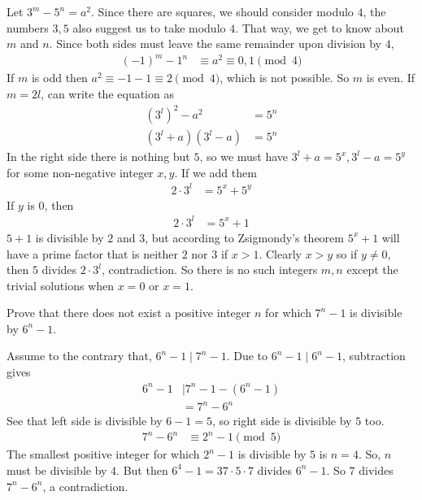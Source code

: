 \begin{solution}
	Let $3^m-5^n=a^2$. Since there are squares, we should consider modulo $4$, the numbers $3,5$ also suggest us to take modulo $4$. That way, we get to know about $m$ and $n$. Since both sides must leave the same remainder upon division by $4$,
	\begin{align*}
		(-1)^m-1^n &\equiv a^2\equiv0,1\pmod4
	\end{align*}
	If $m$ is odd then $a^2\equiv-1-1\equiv2\pmod4$, which is not possible. So $m$ is even.  If $m=2l$, can write the equation as
	\begin{align*}
		\left(3^l\right)^2-a^2 & = 5^n\\
		(3^l+a)(3^l-a) & = 5^n
	\end{align*}
	In the right side there is nothing but $5$, so we must have $3^l+a=5^x,3^l-a=5^y$ for some non-negative integer $x,y$. If we add them
		\begin{align*}
			2\cdot3^l & = 5^x+5^y
		\end{align*}
	If $y$ is $0$, then
		\begin{align*}
			2\cdot3^l & = 5^x+1
		\end{align*}
	$5+1$ is divisible by $2$ and $3$, but according to Zsigmondy's theorem $5^x+1$ will have a prime factor that is neither $2$ nor $3$ if $x>1$. Clearly $x>y$ so if $y\neq0$, then $5$ divides $2\cdot3^l$, contradiction. So there is no such integers $m,n$ except the trivial solutions when $x=0$ or $x=1$.
\end{solution}

\begin{problem}[Croatia $2015$]
	Prove that there does not exist a positive integer $n$ for which $7^n-1$ is divisible by $6^n-1$.
\end{problem}

\begin{solution}
	Assume to the contrary that, $6^n-1\mid 7^n-1$. Due to $6^n-1\mid 6^n-1$, subtraction gives
		\begin{align*}
			6^n-1
				& \mid 7^n-1-(6^n-1)\\
				& = 7^n-6^n
		\end{align*}
	See that left side is divisible by $6-1=5$, so right side is divisible by $5$ too.
		\begin{align*}
			7^n-6^n
				&\equiv2^n-1\pmod5
		\end{align*}
	The smallest positive integer for which $2^n-1$ is divisible by $5$ is $n=4$. So, $n$ must be divisible by $4$. But then $6^4-1=37\cdot5\cdot7$ divides $6^n-1$. So $7$ divides $7^n-6^n$, a contradiction.
\end{solution}

